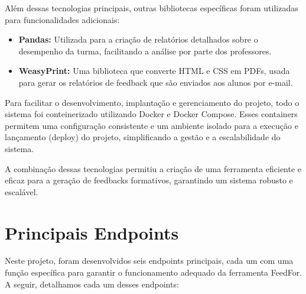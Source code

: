 Além dessas tecnologias principais, outras bibliotecas específicas foram utilizadas para funcionalidades adicionais:

\begin{itemize}
    \item \textbf{Pandas:} Utilizada para a criação de relatórios detalhados sobre o desempenho da turma, facilitando a análise por parte dos professores.
    \item \textbf{WeasyPrint:} Uma biblioteca que converte HTML e CSS em PDFs, usada para gerar os relatórios de feedback que são enviados aos alunos por e-mail.
\end{itemize}

Para facilitar o desenvolvimento, implantação e gerenciamento do projeto, todo o sistema foi conteinerizado utilizando Docker e Docker Compose. Esses containers permitem uma configuração consistente e um ambiente isolado para a execução e lançamento (deploy) do projeto, simplificando a gestão e a escalabilidade do sistema. 

A combinação dessas tecnologias permitiu a criação de uma ferramenta eficiente e eficaz para a geração de feedbacks formativos, garantindo um sistema robusto e escalável.


\section{Principais Endpoints}

Neste projeto, foram desenvolvidos seis endpoints principais, cada um com uma função específica para garantir o funcionamento adequado da ferramenta FeedFor. A seguir, detalhamos cada um desses endpoints:

